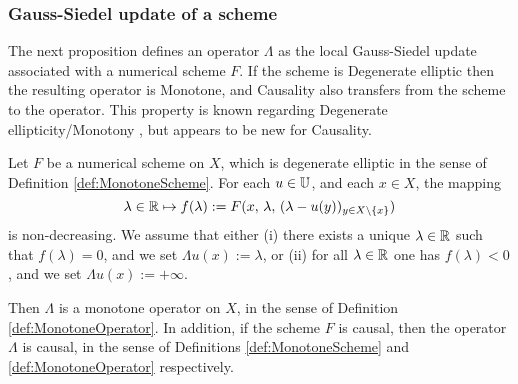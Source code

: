 


\subsubsection{Gauss-Siedel update of a scheme}

The next proposition defines an operator $\Lambda$ as the local Gauss-Siedel update associated with a numerical scheme $F$. If the scheme is Degenerate elliptic then the resulting operator is Monotone, and Causality also transfers from the scheme to the operator. This property is known regarding Degenerate ellipticity/Monotony 
\cite{Oberman2006ConvergentDifference}, but appears to be new for Causality.

\begin{proposition}
\label{prop:GaussSiedelCausal}
	Let $F$ be a numerical scheme on $X$, which is degenerate elliptic in the sense of Definition \ref{def:MonotoneScheme}.
	For each $u \in \mathbb{U}$, and each $x \in X$, the mapping 
	\begin{equation}
	\label{eqdef:fLambda}
		\lambda \in \mathbb{R} \mapsto  f(\lambda) := F(x,\, \lambda,\, (\lambda-u(y))_{y\in X \setminus\{x\}})
	\end{equation}
	is non-decreasing. 
	We assume that either (i) there exists a unique $\lambda \in \mathbb{R}$ such that $f(\lambda)=0$, and we set $\Lambda u(x) := \lambda$, or (ii) for all $\lambda \in \mathbb{R}$ one has $f(\lambda) < 0$, and we set $\Lambda u(x) := +\infty$.
	
	Then $\Lambda$ is a monotone operator on $X$, in the sense of Definition \ref{def:MonotoneOperator}.
	In addition, if the scheme $F$ is causal, then the operator $\Lambda$ is causal, in the sense of Definitions \ref{def:MonotoneScheme} and \ref{def:MonotoneOperator} respectively.	
\end{proposition}

